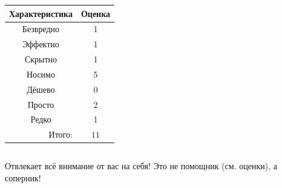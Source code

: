 \begin{frame}
\begin{columns}
            \begin{center}
                \begin{tabular}{c|c}
                    \hline\hline
                    Характеристика              & Оценка\\ \hline\hline
                    Безвредно                   & 1 \\
                    Эффектно                    & 1 \\
                    Скрытно                     & 1 \\
                    Носимо                      & 5 \\
                    Дёшево                      & 0 \\
                    Просто                      & 2 \\ 
                    Редко                       & 1 \\ \hline
                    \multicolumn{1}{r|}{Итого:} & $11$ \\
                \end{tabular}
            \end{center}
    \end{columns}    
    
    Отвлекает \alert{всё} внимание от \alert{вас} на себя! Это \alert{не помощник} (см. оценки), а \alert{соперник}!
\end{frame}





